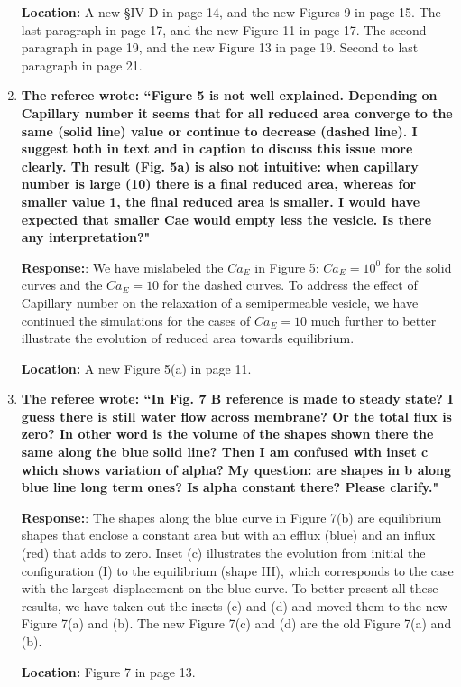 \documentclass[12pt]{article}
\begin{document}
\begin{enumerate}
\noindent
{\bf Location:} A new \S IV D in page 14, and the new Figures 9 in page 15. The last paragraph in page 17, and the new Figure 11 in page 17. The second paragraph in page 19, and the new Figure 13 in page 19. Second to last paragraph in page 21.


\item {\bf 
The referee wrote:
``Figure 5 is not well explained. Depending on Capillary number it
seems that for all reduced area converge to the same (solid line)
value or continue to decrease (dashed line). I suggest both in text
and in caption to discuss this issue more clearly. Th result (Fig. 5a)
is also not intuitive: when capillary number is large (10) there is a
final reduced area, whereas for smaller value 1, the final reduced
area is smaller. I would have expected that smaller Cae would empty
less the vesicle. Is there any interpretation?"}

\noindent
{\bf Response:}: We have mislabeled the $Ca_E$ in Figure 5:  $Ca_E=10^0$
for the solid curves and the $Ca_E=10$ for the dashed curves. To address
the effect of Capillary number on the relaxation of a semipermeable
vesicle, we have continued the simulations for the cases of $Ca_E = 10$
much further to better illustrate the evolution of reduced area towards
equilibrium.

\noindent
{\bf Location:} A new Figure 5(a) in page 11.

\item{\bf
The referee wrote:
``In Fig. 7 B reference is made to steady state? I guess there is
still water flow across membrane? Or the total flux is zero? In other
word is the volume of the shapes shown there the same along the blue
solid line? Then I am confused with inset c which shows variation of
alpha? My question: are shapes in b along blue line long term ones? Is
alpha constant there? Please clarify."}

\noindent
{\bf Response:}: The shapes along the blue curve in Figure 7(b) are
equilibrium shapes that enclose a constant area but with an efflux
(blue) and an influx (red) that adds to zero. Inset (c) illustrates the
evolution from initial  the configuration (I) to the equilibrium (shape
III), which corresponds to the case with the largest displacement on the
blue curve. To better present all these results, we have taken out the
insets (c) and (d) and moved them to the new Figure 7(a) and (b). The
new Figure 7(c) and (d) are the old Figure 7(a) and (b).

\noindent
{\bf Location:} Figure 7 in page 13.


\end{enumerate}
\end{document}
